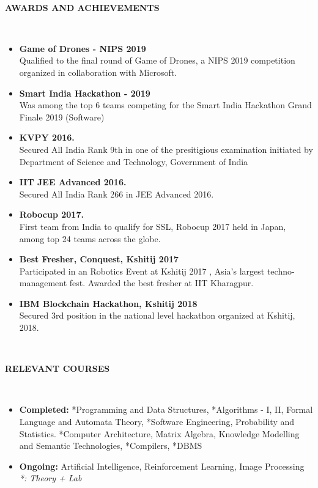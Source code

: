 \documentclass[a4paper,8pt]{article}
\newcommand{\lsep}{-0.5cm}
\newcommand{\resheading}[1]{{\small \colorbox{mygrey}{\begin{minipage}{0.975\textwidth}{\textbf{#1 \vphantom{p\^{E}}}}\end{minipage}}}}
\begin{document}
\hspace{0.5cm}\\[-0.2cm]
\resheading{\textbf{AWARDS AND ACHIEVEMENTS} }\\[\lsep]
\begin{itemize}

\item \noindent \textbf{Game of Drones - NIPS 2019} \\
Qualified to the final round of Game of Drones, a NIPS 2019 competition organized in collaboration with Microsoft.

\item \noindent \textbf{Smart India Hackathon - 2019} \\
Was among the top 6 teams competing for the Smart India Hackathon Grand Finale 2019 (Software)

\item \noindent \textbf{KVPY 2016.} \\
Secured All India Rank 9th in one of the presitigious examination initiated by Department of Science and Technology, Government of India

\item \noindent \textbf{IIT JEE Advanced 2016.} \\
Secured All India Rank 266 in JEE Advanced 2016.

\item \noindent \textbf{Robocup 2017.} \\
First team from India to qualify for SSL, Robocup 2017 held in Japan, among top 24 teams across the globe.

\item \noindent \textbf{Best Fresher, Conquest, Kshitij 2017} \\
Participated in an Robotics Event at Kshitij 2017 , Asia’s largest techno-management fest. Awarded the best fresher at IIT Kharagpur.

\item \noindent \textbf{IBM Blockchain Hackathon, Kshitij 2018} \\
Secured 3rd position in the national level hackathon organized at Kshitij, 2018.

\end{itemize}

\hspace{0.5cm}\\[-0.2cm]
\resheading{\textbf{RELEVANT COURSES} }\\[\lsep]
\begin{itemize}
\item \noindent \textbf{Completed: } *Programming and Data Structures, *Algorithms - I, II, Formal Language and Automata Theory, *Software Engineering,
Probability and Statistics. *Computer Architecture, Matrix Algebra, Knowledge Modelling and Semantic Technologies, *Compilers, *DBMS

\item \noindent \textbf{Ongoing: } Artificial Intelligence, Reinforcement Learning, Image Processing \\
\textit{*: Theory + Lab}
\end{itemize}
\end{document}
